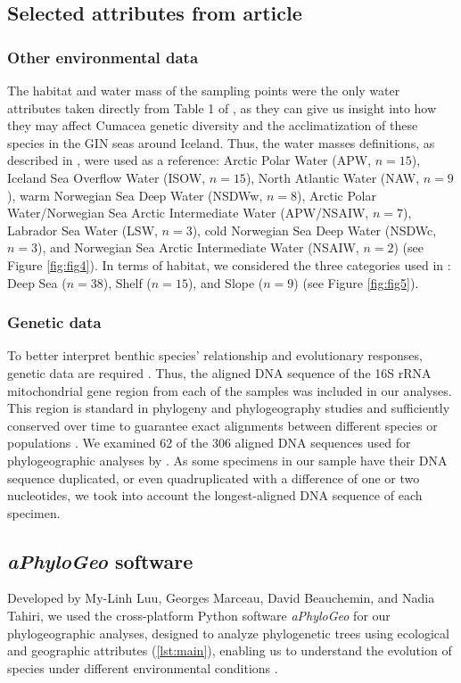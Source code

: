 {\subsection{Selected attributes from article \cite{uhlir_adding_2021}} 
\subsubsection{Other environmental data} 
The habitat and water mass of the sampling points were the only water attributes taken directly from Table 1 of \citep{uhlir_adding_2021}, as they can give us insight into how they may affect Cumacea genetic diversity and the acclimatization of these species in the GIN seas around Iceland. Thus, the water masses definitions, as described in \citep{uhlir_adding_2021}, were used as a reference: Arctic Polar Water (APW, $n=15$), Iceland Sea Overflow Water (ISOW, $n=15$), North Atlantic Water (NAW, $n=9$), warm Norwegian Sea Deep Water (NSDWw, $n=8$), Arctic Polar Water/Norwegian Sea Arctic Intermediate Water (APW/NSAIW, $n=7$), Labrador Sea Water (LSW, $n=3$), cold Norwegian Sea Deep Water (NSDWc, $n=3$), and Norwegian Sea Arctic Intermediate Water (NSAIW, $n=2$) (see Figure \ref{fig:fig4}). In terms of habitat, we considered the three categories used in \citep{uhlir_adding_2021}: Deep Sea ($n=38$), Shelf ($n=15$), and Slope ($n=9$) (see Figure \ref{fig:fig5}).

\subsubsection{Genetic data} 
To better interpret benthic species' relationship and evolutionary responses, genetic data are required \citep{wilson_speciation_1987, uhlir_adding_2021}. Thus, the aligned DNA sequence of the 16S rRNA mitochondrial gene region from each of the samples was included in our analyses. This region is standard in phylogeny and phylogeography studies \citep{hugenholtz1998impact} and sufficiently conserved over time to guarantee exact alignments between different species or populations \citep{saccone1999evolutionary}. We examined 62 of the 306 aligned DNA sequences used for phylogeographic analyses by \citep{uhlir_adding_2021}. As some specimens in our sample have their DNA sequence duplicated, or even quadruplicated with a difference of one or two nucleotides, we took into account the longest-aligned DNA sequence of each specimen.

\subsection{{\textit{aPhyloGeo} software}\label{aPhyloGeo-software}}
Developed by My-Linh Luu, Georges Marceau, David Beauchemin, and Nadia Tahiri, we used the cross-platform Python software \textit{aPhyloGeo} for our phylogeographic analyses, designed to analyze phylogenetic trees using ecological and geographic attributes (\autoref{lst:main}), enabling us to understand the evolution of species under different environmental conditions \citep{koshkarov_phylogeography_2022}. 

}
